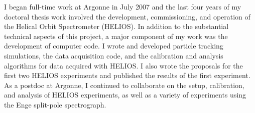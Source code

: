 I began full-time work at Argonne in July 2007 and the last four years of my doctoral thesis work involved the
 development, commissioning, and operation of the Helical Orbit Spectrometer (HELIOS).
In addition to the substantial technical aspects of this project,
 a major component of my work was the development of computer code. %
I wrote and developed particle tracking simulations, %
 the data acquisition code, and %
 the calibration and analysis algorithms for data acquired with HELIOS. 
 I also wrote the proposals for the first two HELIOS experiments and published the results of the first experiment.
As a postdoc at Argonne, 
 I continued to collaborate on %
the setup, calibration, and analysis of HELIOS experiments, as well as %
 a variety of experiments using the Enge split-pole spectrograph.%


